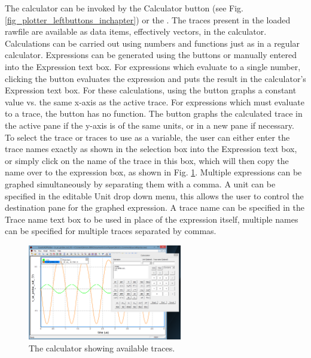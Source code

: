 The calculator can be invoked by the Calculator button (see Fig. \ref{fig_plotter_leftbuttons_inchapter}) or the .  The traces present in the loaded rawfile are available as data items, effectively vectors, in the calculator.  Calculations can be carried out using numbers and functions just as in a regular calculator. Expressions can be generated using the buttons or manually entered into the Expression text box. For expressions which evaluate to a single number, clicking the  button evaluates the expression and puts the result in the calculator's Expression text box. For these calculations, using the  button graphs a constant value vs. the same x-axis as the active trace. For expressions which must evaluate to a trace, the  button has no function. The  button graphs the calculated trace in the active pane if the y-axis is of the same units, or in a new pane if necessary. To select the trace or traces to use as a variable, the user can either enter the trace names exactly as shown in the selection box into the Expression text box, or simply click on the name of the trace in this box, which will then copy the name over to the expression box, as shown in Fig. \ref{fig_plotter_usingcalculator}. Multiple expressions can be graphed simultaneously by separating them with a comma. A unit can be specified in the editable Unit drop down menu, this allows the user to control the destination pane for the graphed expression. A trace name can be specified in the Trace name text box to be used in place of the expression itself, multiple names can be specified for multiple traces separated by commas.

\begin{figure}
    \includegraphics[width=0.6\textwidth]
		{./figures/plotter_netlist_editor_figures/Plotter_Calculator.png} %
    \caption{{The calculator showing available traces.}}
  \label{fig_plotter_usingcalculator}
\end{figure}



